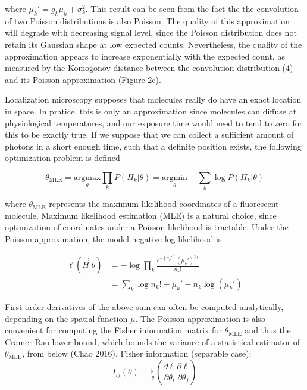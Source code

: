 \documentclass{ucetd}
\begin{document}
where $\mu_{k}' = g_{k}\mu_{k} + \sigma_{k}^{2}$. This result can be seen from the fact the the convolution of two Poisson distributions is also Poisson. The quality of this approximation will degrade with decreasing signal level, since the Poisson distribution does not retain its Gaussian shape at low expected counts. Nevertheless, the quality of the approximation appears to increase exponentially with the expected count, as measured by the Komogonov distance between the convolution distribution (4) and its Poisson approximation (Figure 2c).

Localization microscopy supposes that molecules really do have an exact location in space. In pratice, this is only an approximation since molecules can diffuse at physiological temperatures, and our exposure time would need to tend to zero for this to be exactly true. If we suppose that we can collect a sufficient amount of photons in a short enough time, such that a definite position exists, the following optimization problem is defined

\begin{equation*}
\theta_{\mathrm{MLE}} = \underset{\theta}{\mathrm{argmax}}\prod_{k}P(H_{k}|\theta)= \underset{\theta}{\mathrm{argmin}}-\sum_{k}\log P(H_{k}|\theta)
\end{equation*}


where $\theta_{\mathrm{MLE}}$ represents the maximum likelihood coordinates of a fluorescent molecule. Maximum likelihood estimation (MLE) is a natural choice, since optimization of coordinates under a Poisson likelihood is tractable. Under the Poisson approximation, the model negative log-likelihood is

\begin{align}
\ell(\vec{H}|\theta) &= -\log \prod_{k} \frac{e^{-\left(\mu_{k}'\right)}\left(\mu_{k}'\right)^{n_{k}}}{n_{k}!}\\
&= \sum_{k}  \log n_{k}! + \mu_{k}' - n_{k}\log\left(\mu_{k}'\right)
\end{align}

First order derivatives of the above sum can often be computed analytically, depending on the spatial function $\mu$. The Poisson approximation is also convenient for computing the Fisher information matrix for $\theta_{\mathrm{MLE}}$ and thus the Cramer-Rao lower bound, which bounds the variance of a statistical estimator of $\theta_{\mathrm{MLE}}$, from below (Chao 2016).
Fisher information (separable case): \begin{equation}
I_{ij}(\theta) = \underset{\theta}{\mathbb{E}}\left(\frac{\partial \ell}{\partial\theta_{i}}\frac{\partial\ell}{\partial\theta_{j}}\right) 
\end{equation}
\end{document}
